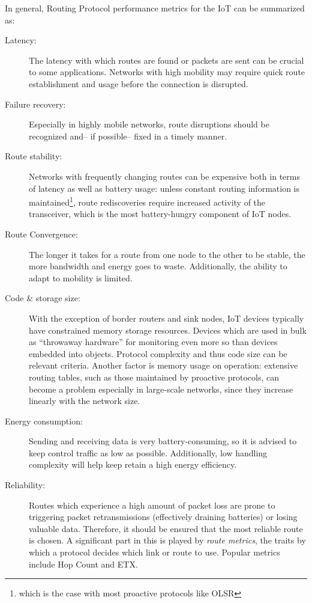 \documentclass{acm_proc_article-sp}
\begin{document}
In general, Routing Protocol performance metrics for the IoT can be summarized as:
\begin{description}
\item[Latency:] The latency with which routes are found or packets are sent can be crucial to some applications. Networks with high mobility may require quick route establishment and usage before the connection is disrupted.
\item[Failure recovery:] Especially in highly mobile networks, route disruptions should be recognized and-- if possible-- fixed in a timely manner.
\item[Route stability:] Networks with frequently changing routes can be expensive both in terms of latency as well as battery usage: unless constant routing information is maintained\footnote{ which is the case with most proactive protocols like OLSR\cite{RFC-3626}}, route rediscoveries require increased activity of the transceiver, which is the most battery-hungry component of IoT nodes.
\item[Route Convergence:] The longer it takes for a route from one node to the other to be stable, the more bandwidth and energy goes to waste. Additionally, the ability to adapt to mobility is limited. %
\item[Code \& storage size:] With the exception of border routers and sink nodes, IoT devices typically have constrained memory storage resources. Devices which are used in bulk as ``throwaway hardware'' for monitoring even more so than devices embedded into objects. Protocol complexity and thus code size can be relevant criteria. Another factor is memory usage on operation: extensive routing tables, such as those maintained by proactive protocols, can become a problem especially in large-scale networks, since they increase linearly with the network size. %
\item[Energy consumption:] Sending and receiving data is very battery-consuming, so it is advised to keep control traffic as low as possible. Additionally, low handling complexity will help keep retain a high energy efficiency.
\item[Reliability:] Routes which experience a high amount of packet loss are prone to triggering packet retransmissions (effectively draining batteries) or losing valuable data. Therefore, it should be ensured that the most reliable route is chosen. A significant part in this is played by \emph{route metrics}, the traits by which a protocol decides which link or route to use. Popular metrics include Hop Count and \gls{ETX}.
\end{description}
\end{document}
